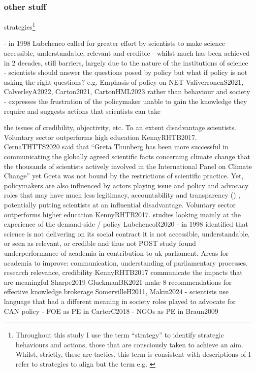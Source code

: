 \subsubsection{other stuff}
strategies\footnote{Throughout this study I use the term ``strategy'' to identify strategic behaviours and actions, those that are consciously taken to achieve an aim. Whilst, strictly, these are tactics, this term is consistent with descriptions of  I refer to strategies to align but the term  e.g. \cite{WeimerV2015}}

\cite{LubchencoR2020} - in 1998 Lubchenco called for greater effort by scientists to make science accessible, understandable, relevant and credible - whilst much has been achieved in 2 decades, still barriers, largely due to the nature of the institutions of science
\cite{Gerber2023} - scientists should answer the questions posed by policy but what if policy is not asking the right questions? e.g. Emphasis of policy on NET ValiverronenS2021, CalverleyA2022, Carton2021, CartonHML2023 rather than behaviour and society
\cite{Bisbal2024} - expresses the frustration of the policymaker unable to gain the knowledge they require and suggests actions that scientists can take 


the issues of credibility, objectivity, etc. To an extent disadvantage scientists. Voluntary sector outperforms high education KennyRHTB2017. CernaTHTTS2020 said that ``Greta Thunberg has been more successful in communicating the globally agreed scientific facts concerning climate change that the thousands of scientists actively involved in the International Panel on Climate Change'' yet Greta was not bound by the restrictions of scientific practice. Yet, policymakers are also influenced by actors playing issue and policy and advocacy roles that may have much less legitimacy, accountability and transparency (\cite{Kingdon1993,Knaggard2015,Cairney2018,vonMalmborg2024strategies}) , potentially putting scientists at an influential disadvantage. Voluntary sector outperforms higher education KennyRHTB2017. studies looking mainly at the experience of the demand-side / policy
LubchencoR2020 - in 1998 identified that science is not delivering on its social contract it is not accessible, understandable, or seen as relevant, or credible and thus not 
POST study found underperformance of academia in contribution to uk parliament. Areas for academia to improve: communication, understanding of parliamentary processes, research relevance, credibility KennyRHTB2017  
communicate the impacts that are meaningful Sharpe2019
GluckmanBK2021 make 8 recommendations for effective knowledge brokerage
SomervilleH2011, Makin2024 - scientists use language that had a different meaning in society 
roles played to advocate for CAN policy - FOE as PE in CarterC2018 - NGOs as PE in Braun2009

